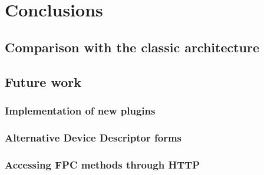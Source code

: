 \chapter{Conclusions}

\section{Comparison with the classic architecture}

\section{Future work}

\subsection{Implementation of new plugins}

\subsection{Alternative Device Descriptor forms}

\subsection{Accessing FPC methods through HTTP}